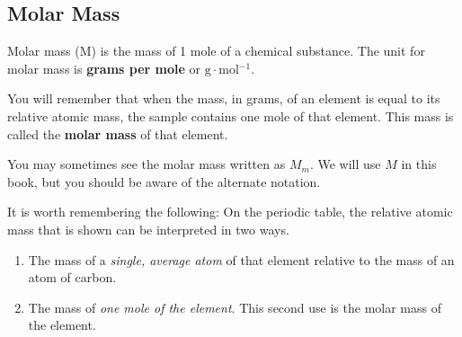             \subsection{ Molar Mass}
            \nopagebreak
\par
            \label{m38717*fhsst!!!underscore!!!id147}
 { \label{m38717*meaningfhsst!!!underscore!!!id147}
      \label{m38717*id276397}Molar mass (M) is the mass of 1 mole of a chemical substance. The unit for molar mass is \textbf{grams per mole} or $\mathrm{g}\ensuremath{\cdot}\mathrm{mol}{}^{-1}$. \par 
       } 
      \label{m38717*id276429}You will remember that when the mass, in grams, of an element is equal to its relative atomic mass, the sample contains one mole of that element. This mass is called the \textbf{molar mass} of that element.\par 
      \label{m38717*eip-277}You may sometimes see the molar mass written as ${M}_{m}$. We will use $M$ in this book, but you should be aware of the alternate notation.\par \label{m38717*id276445}It is worth remembering the following: On the periodic table, the relative atomic mass that is shown can be interpreted in two ways.\par 
      \label{m38717*id276451}\begin{enumerate}[noitemsep, label=\textbf{\arabic*}. ] 
            \label{m38717*uid9}\item The mass of a \textsl{single, average atom} of that element relative to the mass of an atom of carbon.
\label{m38717*uid10}\item The mass of \textsl{one mole of the element}. This second use is the molar mass of the element.
\end{enumerate}

